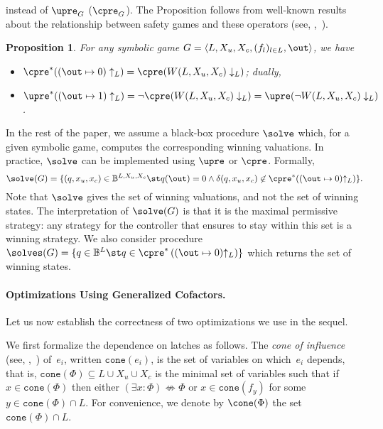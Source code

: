 \documentclass[submission,copyright,creativecommons]{eptcs}
\newtheorem{proposition}{Proposition}
\begin{document}
instead of $\upre_G$ ($\cpre_G$). The Proposition follows from well-known
results about the relationship between safety games and these operators (see,
\eg,~\cite{ag11}).
\begin{proposition}
	For any symbolic game $G = \langle L, X_u, X_c, (f_l)_{l \in L},
	\out\rangle$, we have
	\begin{itemize}
		\item $\cpre^*( (\out \mapsto 0)\uparrow_L) = \cpre(
			W(L,X_u,X_c)\downarrow_L)$; dually,
		\item $\upre^*( (\out \mapsto 1)\uparrow_L) = {\lnot
			\cpre(W(L,X_u,X_c) \downarrow_L)} = {\upre(\lnot
			W(L,X_u,X_c)\downarrow_L)}$.
	\end{itemize}
\end{proposition}

In the rest of the paper, we assume a black-box procedure $\solve$ which, for a
given symbolic game, computes the corresponding winning valuations.  In
practice, $\solve$ can be implemented using $\upre$ or $\cpre$. Formally, 
\[
	\solve(G) = \{ (q,x_u,x_c) \in \mathbb{B}^{L,X_u,X_c} \st q(\out) = 0
	\land \delta(q,x_u,x_c) \not\in \cpre^*( (\out \mapsto 0){\uparrow_L})
	\}.
\]
Note that $\solve$ gives the set of winning valuations, and not the set of
winning states. The interpretation of $\solve(G)$ is that it is the maximal
permissive strategy: any strategy for the controller that ensures to stay within
this set is a winning strategy.  We also consider procedure $\solves(G) = \{ q
\in \mathbb{B}^L \st q \in \cpre^*\left( (\out \mapsto 0){\uparrow_L}
\right)\}$ which returns the set of winning states.

\paragraph{Optimizations Using Generalized Cofactors.}
Let us now establish the correctness of two optimizations we use in the sequel.

We first formalize the dependence on latches as follows.  The \emph{cone of
influence} (see, \eg,~\cite{cgp01}) of~$e_i$, written $\texttt{cone}(e_i)$, is
the set of variables on which~$e_i$ depends, that is, $\texttt{cone}(\Phi)
\subseteq L \cup X_u \cup X_c$ is the minimal set of variables such that if $x
\in \texttt{cone}(\Phi)$ then either $(\exists x: \Phi) \not \Leftrightarrow
\Phi$ or $x \in \texttt{cone}(f_{y})$ for some $y \in \texttt{cone}(\Phi) \cap
L$. For convenience, we denote by $\cone(\Phi)$ the set $\texttt{cone}(\Phi)
\cap L$.
\end{document}
